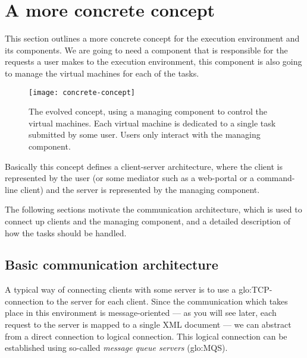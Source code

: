 \section{A more concrete concept}

This  section   outlines  a  more  concrete  concept   for  the  execution
environment and its  components. We are going to need  a component that is
responsible for  the requests a  user makes to the  execution environment,
this component  is also going to  manage the virtual machines  for each of
the tasks.

\begin{figure}[htbp]
  \begin{center}
    \begin{minipage}{.75\textwidth}
      \begin{center}
        \texttt{[image: concrete-concept]}
      \end{center}
      \caption[A  more  concrete  concept]{The  evolved concept,  using  a
        managing component to control  the virtual machines.  Each virtual
        machine  is   dedicated  to  a  single  task   submitted  by  some
        user. Users only interact with the managing component.}
      \label{fig:concrete-concept}
    \end{minipage}
  \end{center}
\end{figure}

Basically  this concept  defines a  client-server architecture,  where the
client is represented  by the user (or some mediator  such as a web-portal
or a  command-line client) and the  server is represented  by the managing
component.

The following  sections motivate the communication  architecture, which is
used  to connect up  clients and  the managing  component, and  a detailed
description of how the tasks should be handled.

\subsection{Basic communication architecture}
\label{sec:basic-communcation-architecture}

A  typical  way  of connecting  clients  with  some  server  is to  use  a
\gls{glo:TCP}-connection  to  the  server  for  each  client.   Since  the
communication which  takes place  in this environment  is message-oriented
--- as  you will  see later,  each request to  the server  is mapped  to a
single  XML document  ---  we can  abstract  from a  direct connection  to
logical  connection.  This logical  connection  can  be established  using
so-called \emph{message queue servers} (\gls{glo:MQS}).

